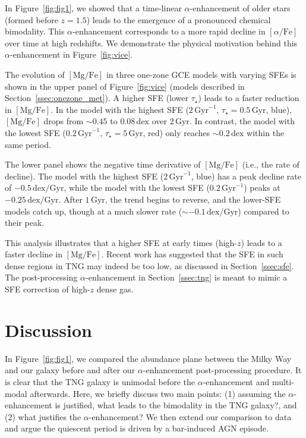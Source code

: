 \documentclass[twocolumn]{aastex631}
\newcommand{\Gyr}{\ensuremath{\textrm{Gyr}}}
\newcommand{\MgFe}{\ensuremath{[\textrm{Mg}/\textrm{Fe}]}}
\newcommand{\alphaFe}{\ensuremath{[\alpha/\textrm{Fe}]}}
\newcommand{\dex}{\ensuremath{\textrm{dex}}}
\begin{document}
In Figure~\ref{fig:fig1}, we showed that a time-linear $\alpha$-enhancement of older stars (formed before $z=1.5$) leads to the emergence of a pronounced chemical bimodality. This $\alpha$-enhancement corresponds to a more rapid decline in \alphaFe{} over time at high redshifts. 
We demonstrate the physical motivation behind this $\alpha$-enhancement in Figure~\ref{fig:vice}.

The evolution of \MgFe{} in three one-zone GCE models with varying SFEs is shown in the upper panel of Figure~\ref{fig:vice} (models described in Section~\ref{ssec:onezone_met}). A higher SFE (lower $\tau_\star$) leads to a faster reduction in \MgFe{}. In the model with the highest SFE ($2\,\Gyr^{-1}$, $\tau_\star=0.5\,\Gyr$, blue), \MgFe{} drops from $\sim0.45$ to $0.08\,\dex$ over $2\,\Gyr$. In contrast, the model with the lowest SFE ($0.2\,\Gyr^{-1}$, $\tau_\star=5\,\Gyr$, red) only reaches $\sim0.2\,\dex$ within the same period.

The lower panel shows the negative time derivative of \MgFe{} (i.e., the rate of decline). The model with the highest SFE ($2\,\Gyr^{-1}$, blue) has a peak decline rate of $-0.5\,\dex/\Gyr$, while the model with the lowest SFE ($0.2\,\Gyr^{-1}$) peaks at $-0.25\,\dex/\Gyr$. After $1\,\Gyr$, the trend begins to reverse, and the lower-SFE models catch up, though at a much slower rate ($\sim-0.1\,\dex/\Gyr$) compared to their peak.

This analysis illustrates that a higher SFE at early times (high-$z$) leads to a faster decline in \MgFe{}. Recent work has suggested that the SFE in such dense regions in TNG may indeed be too low, as discussed in Section~\ref{ssec:sfe}. The post-processing $\alpha$-enhancement in Section~\ref{ssec:tng} is meant to mimic a SFE correction of high-$z$ dense gas.

\section{Discussion}\label{sec:disc}
In Figure~\ref{fig:fig1}, we compared the abundance plane between the Milky Way and our galaxy before and after our $\alpha$-enhancement post-processing procedure. It is clear that the TNG galaxy is unimodal before the $\alpha$-enhancement and multi-modal afterwards. Here, we briefly discuss two main points: (1) assuming the $\alpha$-enhancement is justified, what leads to the bimodality in the TNG galaxy?, and (2) what justifies the $\alpha$-enhancement? We then extend our comparison to data and argue the quiescent period is driven by a bar-induced AGN episode.
\end{document}
